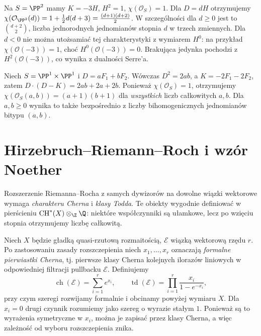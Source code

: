 \begin{przyklad}
\label{prz:ga7-rr-p2}
Na $S=\PP^2$ mamy $K=-3H$, $H^2=1$,
$\chi(\mathcal O_S)=1$. Dla $D=dH$ otrzymujemy
$\chi(\mathcal O_{\PP^2}(d))=1+\frac12d(d+3)
=\frac{(d+1)(d+2)}2$.
W szczególności dla $d\ge0$ jest to
$\binom{d+2}{2}$, liczba jednorodnych jednomianów
stopnia $d$ w trzech zmiennych.
Dla $d<0$ nie można utożsamiać tej charakterystyki
z wymiarem $H^0$: na przykład
$\chi(\mathcal O(-3))=1$, choć $H^0(\mathcal O(-3))=0$.
Brakująca jedynka pochodzi z $H^2(\mathcal O(-3))$,
co wynika z dualności Serre'a.
\end{przyklad}

\begin{przyklad}
Niech $S=\PP^1\times\PP^1$ i
$D=aF_1+bF_2$. Wówczas $D^2=2ab$, a
$K=-2F_1-2F_2$, zatem
$D\cdot(D-K)=2ab+2a+2b$.
Ponieważ $\chi(\mathcal O_S)=1$,
otrzymujemy
$\chi(\mathcal O_S(a,b))=(a+1)(b+1)$
dla \emph{wszystkich} liczb całkowitych $a,b$.
Dla $a,b\ge0$ wynika to także bezpośrednio z liczby
bihomogenicznych jednomianów bitypu $(a,b)$.
\end{przyklad}

\section{Hirzebruch--Riemann--Roch i wzór Noether}
\label{sec:ga7-noether}

Rozszerzenie Riemanna--Rocha z samych dywizorów
na dowolne wiązki wektorowe wymaga \emph{charakteru Cherna}
i \emph{klasy Todda}. Te obiekty wygodnie definiować
w pierścieniu $\operatorname{CH}^*(X)\otimes_\Z\Q$:
niektóre współczynniki są ułamkowe, lecz po wzięciu
stopnia otrzymujemy liczbę całkowitą.

\begin{definicja}
\label{def:ga7-ch-td}
Niech $X$ będzie gładką quasi-rzutową rozmaitością,
$\mathcal E$ wiązką wektorową rzędu $r$.
Po zastosowaniu zasady rozszczepienia niech
$x_1,\ldots,x_r$ oznaczają \emph{formalne pierwiastki Cherna},
tj. pierwsze klasy Cherna kolejnych ilorazów liniowych
w odpowiedniej filtracji pullbacku $\mathcal E$.
Definiujemy
\[
\operatorname{ch}(\mathcal E)=\sum_{i=1}^r e^{x_i},
\qquad
\operatorname{td}(\mathcal E)=\prod_{i=1}^r
\frac{x_i}{1-e^{-x_i}},
\]
przy czym szeregi rozwijamy formalnie i obcinamy
powyżej wymiaru $X$. Dla $x_i=0$ drugi czynnik
rozumiemy jako szereg o wyrazie stałym $1$.
Ponieważ są to wyrażenia symetryczne w $x_i$,
można je zapisać przez klasy Cherna, a więc
zależność od wyboru rozszczepienia znika.
\end{definicja}

